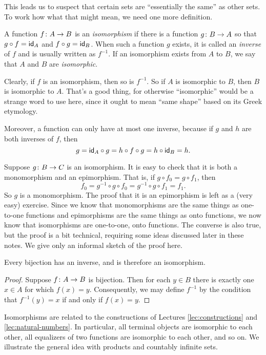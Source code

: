 This leads us to suspect that certain sets are ``essentially the same'' as other sets. 
To work how what that might mean, we need one more definition.

\begin{defn}
	A function ${f}\colon{A}\to{B}$ is an \emph{isomorphism} if there is a function
	${g}\colon{B}\to{A}$ so that $g\circ f = \textsf{id}_A$ and $f\circ g= \textsf{id}_B$. 
	When such a function $g$ exists, it is called an \emph{inverse} of $f$ and is usually written as $f^{-1}$. 
	If an isomorphism exists from $A$ to $B$, we say that $A$ and $B$ are \emph{isomorphic}.
\end{defn}

Clearly, if $f$ is an isomorphism, then so is $f^{-1}$. 
So if $A$ is isomorphic to $B$, then $B$ is isomorphic to $A$. 
That's a good thing, for otherwise ``isomorphic'' would be a strange word to use here, since it ought to mean ``same shape'' based on its Greek etymology. 

Moreover, a function  can only have at most one inverse, because if $g$ and $h$ are both inverses of $f$,
then \[g = \textsf{id}_A\circ g = h\circ f\circ g = h\circ \textsf{id}_B = h.\]

Suppose ${g}\colon{B}\to{C}$ is an isomorphism.
It is easy to check that it is both a monomorphism and an epimorphism. 
That is, if $g\circ f_0 = g\circ f_1$, then \[f_0 = g^{-1}\circ g\circ f_0 = g^{-1}\circ g\circ f_1 = f_1.\] 
So $g$ is a monomorphism.
The proof that it is an epimorphism is left as a (very easy) exercise. 
Since we know that monomorphisms are the same things as one-to-one functions and epimorphisms are the same things as onto functions, we now know that isomorphisms are one-to-one, onto functions.
The converse is also true, but the proof is a bit technical, requiring some ideas discussed later in these notes.
We give only an informal sketch of the proof here.

\begin{lemma}
	Every bijection has an inverse, and is therefore an isomorphism.
	
	\begin{proof}
		Suppose ${f}\colon{A}\to{B}$ is bijection. Then for each $y\in B$ there is exactly one $x\in A$ for which $f(x)=y$. Consequently, we may define $f^{-1}$ by the condition that $f^{-1}(y)=x$ if and only if $f(x)=y$. 
	\end{proof}
\end{lemma}

Isomorphisms are related to the constructions of Lectures \ref{lec:constructions} and \ref{lec:natural-numbers}. 
In particular, all terminal objects are isomorphic to each other, all equalizers of two functions are isomorphic to each other, and so on. 
We illustrate the general idea with products and countably infinite sets. 

